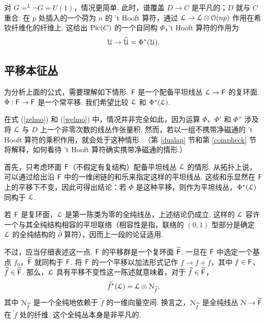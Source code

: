 对 $G=^L\neg G=U(1)$，情况更简单.
此时，谱覆盖 $D\to C$ 是平凡的；$D$ 就与 $C$ 重合.
在 $p$ 处插入的一个荷为 $n$ 的 't Hooft 算符，通过 $\L\to \L\otimes \O(np)$ 作用在希钦纤维化的纤维上.
这给出 $\Pic(C)$ 的一个自同构 $\Phi$，'t Hooft 算符的作用为
\begin{equation}\label{welmo}\U\to \hat \U=\Phi^*(\U).\end{equation}





\subsection{平移本征丛}
\label{flate}

为分析上面的公式，需要理解如下情形.
$\cF$ 是一个配备平坦线丛 $\L\to \cF$ 的复环面.
$\Phi:\cF\to \cF$ 是一个常平移.
我们希望比较 $\L$ 和 $\Phi^*(\L)$.

在式 (\ref{zelmo}) 和 (\ref{welmo}) 中，情况并非完全如此，因为运算 $\Phi$、$\Phi'$ 和 $\Phi''$ 涉及将 $\L$ 与 $D$ 上一个非零次数的线丛作张量积.
然而，若以一组不携带净磁通的 't Hooft 算符的乘积作用，就会处于这种情形.
（第 \ref{dualap} 节和第 \ref{compheck} 节将解释，如何看待 't Hooft 算符确实携带净磁通的情形.）


首先，只考虑环面 $\cF$（不假定有复结构）配备平坦线丛 $ {\cal L}$ 的情形.
从拓扑上说，可以通过给出沿 $\cF$ 中的一维闭链的和乐来指定这样的平坦线丛.
这些和乐显然在 $\cF$ 上的平移下不变，因此可得出结论：若 $\Phi$ 是这种平移，则作为平坦线丛，$\Phi^*({\cal L})$ 同构于 $ {\cal L}$.

若 $\cF$ 是复环面，$ {\cal L}$ 是第一陈类为零的全纯线丛，上述结论仍成立.
这样的 $ {\cal L}$ 容许一个与其全纯结构相容的平坦联络（相容性是指，联络的 $(0,1)$ 型部分是确定 $ {\cal L}$ 的全纯结构的 $\bar\partial$ 算符），因而上一段的论证适用.

不过，应当仔细表述这一点.
$\cF$ 的平移群是一个复环面 $\tilde \cF$.
一旦在 $\cF$ 中选定一个基点 $f_0$，$\tilde \cF$ 就同构于 $\cF$.
将 $\cF$ 的一个平移以加法形式记作 $f\to f+\tilde f$，其中 $f\in \cF$、$\t f\in \t \cF$.
那么，$ {\cal L}$ 具有平移不变性这一陈述就意味着，对于 $\tilde f\in \tilde \cF$，
\begin{equation}\label{gaggle}\tilde f^*({\cal L})={\cal L}\otimes
{\cal N}_{\tilde f},\end{equation}
其中 $ {\cal N}_{\tilde f}$ 是一个全纯地依赖于 $\tilde f$ 的一维向量空间.
换言之，$ {\cal N}_{\tilde f}$ 是全纯线丛 $ {\cal N}\to \tilde \cF$ 在 $ {\tilde f}$ 处的纤维.
这个全纯丛本身是非平凡的.



